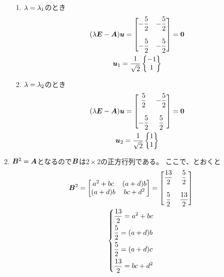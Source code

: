 \begin{ans*}
\begin{enumerate}[label=(\arabic*)]
    \begin{enumerate}[label=(\roman*)]
      \item ${\lambda} = {\lambda}_1$のとき
      \begin{gather}
        ({\lambda} \bm{E} - \bm{A}){\bm{u}}
        =
        \begin{bmatrix}
          {\displaystyle-\frac{5}{2}} & {\displaystyle -\frac{5}{2}} \\
          \\
          {\displaystyle -\frac{5}{2}} & {\displaystyle -\frac{5}{2}} \\
        \end{bmatrix}
        = \bm{0} \\
        {\bm{u}}_1 =
        \frac{1}{\sqrt{2}}
        \begin{Bmatrix}
          -1 \\ 1
        \end{Bmatrix}
      \end{gather}
      \item ${\lambda} = {\lambda}_2$のとき
      \begin{gather}
        ({\lambda} \bm{E} - \bm{A}){\bm{u}}
        =
        \begin{bmatrix}
          {\displaystyle\frac{5}{2}} & {\displaystyle -\frac{5}{2}} \\
          \\
          {\displaystyle -\frac{5}{2}} & {\displaystyle \frac{5}{2}} \\
        \end{bmatrix}
        = \bm{0} \\
        {\bm{u}}_2 =
        \frac{1}{\sqrt{2}}
        \begin{Bmatrix}
          1 \\ 1
        \end{Bmatrix}
      \end{gather}
    \end{enumerate}
    \item $\bm{B}^2 = \bm{A}$となるので$\bm{B}$は$2\times2$の正方行列である。
    ここで、とおくと
    \begin{gather}
      \bB^2 =
      \bmat{
        a^2+bc & (a+d)b \\
        (a+d)b & bc+d^2
      }
      =
      \bmat{
        {\disp \frac{13}{2}} & {\disp \frac{5}{2}} \\
        \\
        {\disp \frac{5}{2}} & {\disp \frac{13}{2}} \\
      }
      \\
      \begin{dcases*}
        \frac{13}{2} = a^2 + bc \\
        \frac{5}{2} = (a+d)b \\
        \frac{5}{2} = (a+d)c \\
        \frac{13}{2} = bc + d^2
      \end{dcases*}
    \end{gather}

\end{enumerate}
\end{ans*}
